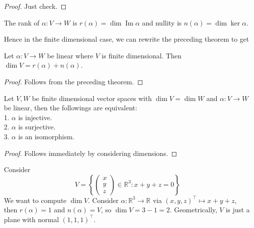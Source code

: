 \begin{proof}
    Just check.
\end{proof}
\begin{definition}
    The rank of $\alpha:V\to W$ is $r(\alpha)=\dim\operatorname{Im}\alpha$ and nullity is $n(\alpha)=\dim\ker\alpha$.
\end{definition}
Hence in the finite dimensional case, we can rewrite the preceding theorem to get
\begin{theorem}
    Let $\alpha:V\to W$ be linear where $V$ is finite dimensional.
    Then $\dim V=r(\alpha)+n(\alpha)$.
\end{theorem}
\begin{proof}
    Follows from the preceding theorem.
\end{proof}
\begin{corollary}
    Let $V,W$ be finite dimensional vector spaces with $\dim V=\dim W$ and $\alpha:V\to W$ be linear, then the followings are equivalent:\\
    1. $\alpha$ is injective.\\
    2. $\alpha$ is surjective.\\
    3. $\alpha$ is an isomorphism.
\end{corollary}
\begin{proof}
    Follows immediately by considering dimensions.
\end{proof}
\begin{example}
    Consider
    $$V=\left\{ \begin{pmatrix}
        x\\
        y\\
        z
    \end{pmatrix}\in\mathbb R^3:x+y+z=0\right\}$$
    We want to compute $\dim V$.
    Consider $\alpha:\mathbb R^3\to\mathbb R$ via $(x,y,z)^\top\mapsto x+y+z$, then $r(\alpha)=1$ and $n(\alpha)=V$, so $\dim V=3-1=2$.
    Geometrically, $V$ is just a plane with normal $(1,1,1)^\top$.
\end{example}